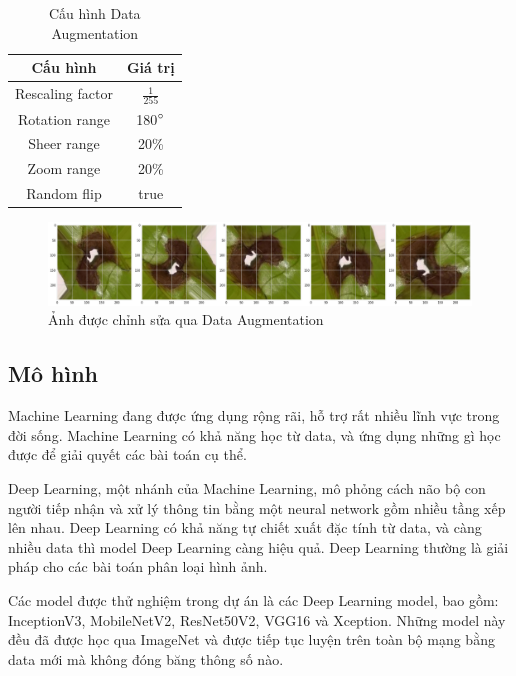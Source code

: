 \documentclass[a4paper,14pt]{extarticle}
\begin{document}
	\begin{table}[H]
		\centering
		\renewcommand{\arraystretch}{1.2}
		\begin{tabular}{|c|c|}
		\hline
		Cấu hình         & Giá trị         \\ \hline
		Rescaling factor & $\frac{1}{255}$ \\ \hline
		Rotation range   & 180$\degree$    \\ \hline
		Sheer range      & 20\%            \\ \hline
		Zoom range       & 20\%            \\ \hline
		Random flip      & true            \\ \hline
		\end{tabular}

		\caption{Cấu hình Data Augmentation}
	\end{table}

	\begin{figure}[H]
		\centering
		\includegraphics[scale=0.25]{images/image2}
		\caption{Ảnh được chỉnh sửa qua Data Augmentation}
	\end{figure}

	\subsection{Mô hình}
	Machine Learning đang được ứng dụng rộng rãi, hỗ trợ rất nhiều lĩnh vực trong đời sống. Machine Learning có khả năng học từ data, và ứng dụng những gì học được để giải quyết các bài toán cụ thể.

	Deep Learning, một nhánh của Machine Learning, mô phỏng cách não bộ con người tiếp nhận và xử lý thông tin bằng một neural network gồm nhiều tầng xếp lên nhau. Deep Learning có khả năng tự chiết xuất đặc tính từ data, và càng nhiều data thì model Deep Learning càng hiệu quả. Deep Learning thường là giải pháp cho các bài toán phân loại hình ảnh.

	Các model được thử nghiệm trong dự án là các Deep Learning model, bao gồm: InceptionV3, MobileNetV2, ResNet50V2, VGG16 và Xception. Những model này đều đã được học qua ImageNet và được tiếp tục luyện trên toàn bộ mạng bằng data mới mà không đóng băng thông số nào.
\end{document}
